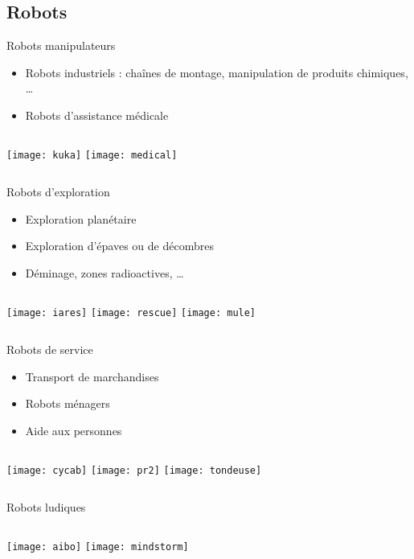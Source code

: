 \documentclass[compress]{beamer}
\begin{document}
\subsection{Robots}
\begin{frame}{Robots manipulateurs}
\begin{itemize}
\item Robots industriels : chaînes de montage, manipulation de produits chimiques, \dots
\item Robots d'assistance médicale
\end{itemize}
\begin{columns}
	\texttt{[image: kuka]}
	\texttt{[image: medical]}
\end{columns}
\end{frame}

\begin{frame}{Robots d'exploration}
\begin{itemize}
\item Exploration planétaire
\item Exploration d'épaves ou de décombres
\item Déminage, zones radioactives, \dots
\end{itemize}
\begin{columns}
	\texttt{[image: iares]}
	\texttt{[image: rescue]}
	\texttt{[image: mule]}
\end{columns}
\end{frame}

\begin{frame}{Robots de service}
\begin{itemize}
\item Transport de marchandises
\item Robots ménagers
\item Aide aux personnes
\end{itemize}
\begin{columns}
	\texttt{[image: cycab]}
	\texttt{[image: pr2]}
	\texttt{[image: tondeuse]}
\end{columns}
\end{frame}

\begin{frame}{Robots ludiques}
\begin{columns}
	\texttt{[image: aibo]}
	\texttt{[image: mindstorm]}
\end{columns}
\end{frame}
\end{document}
